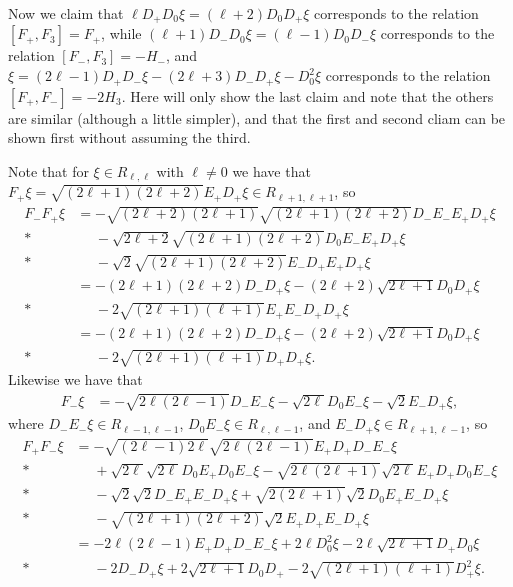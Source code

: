 Now we claim that $\ell D_+D_0\xi = (\ell+2)D_0D_+\xi$ corresponds to the relation $[F_+,F_3]=F_+$, while $(\ell+1)D_-D_0\xi = (\ell-1)D_0D_-\xi$ corresponds to the relation $[F_-,F_3]=-H_-$, and $\xi=(2\ell-1)D_+D_- \xi - (2\ell+3)D_-D_+ \xi - D_0^2 \xi$ corresponds to the relation $[F_+,F_-]=-2H_3$. Here will only show the last claim and note that the others are similar (although a little simpler), and that the first and second cliam can be shown first without assuming the third.

Note that for $\xi\in R_{\ell,\ell}$ with $\ell\neq 0$ we have that $F_+\xi = \sqrt{(2\ell+1)(2\ell+2)}E_+D_+\xi \in R_{\ell+1,\ell+1}$, so
\begin{align*}
  F_-F_+ \xi &= -\sqrt{(2\ell+2)(2\ell+1)}\sqrt{(2\ell+1)(2\ell+2)} D_-E_-E_+D_+ \xi \\*
           &\phantom{{}={}}{} - \sqrt{2\ell+2}\sqrt{(2\ell+1)(2\ell+2)} D_0E_-E_+D_+ \xi \\*
           &\phantom{{}={}}{} - \sqrt{2}\sqrt{(2\ell+1)(2\ell+2)}E_-D_+E_+D_+ \xi \\
           &= -(2\ell+1)(2\ell+2) D_-D_+ \xi - (2\ell+2)\sqrt{2\ell+1} D_0D_+ \xi \\*
           &\phantom{{}={}}{} - 2\sqrt{(2\ell+1)(\ell+1)} E_+E_-D_+D_+ \xi \\
           &= -(2\ell+1)(2\ell+2) D_-D_+ \xi - (2\ell+2)\sqrt{2\ell+1} D_0D_+ \xi \\*
           &\phantom{{}={}}{} - 2\sqrt{(2\ell+1)(\ell+1)} D_+D_+ \xi.
\end{align*}
Likewise we have that
\begin{align*}
  F_- \xi &= -\sqrt{2\ell(2\ell-1)}D_-E_- \xi - \sqrt{2\ell}D_0E_-\xi - \sqrt{2}E_-D_+\xi,
\end{align*}
where $D_-E_-\xi \in R_{\ell-1,\ell-1}$, $D_0E_-\xi \in R_{\ell,\ell-1}$, and $E_-D_+\xi \in R_{\ell+1,\ell-1}$, so
\begin{align*}
  F_+F_- \xi &= -\sqrt{(2\ell-1)2\ell}\sqrt{2\ell(2\ell-1)}E_+D_+D_-E_- \xi \\*
           &\phantom{{}={}}{} + \sqrt{2\ell}\sqrt{2\ell}D_0E_+D_0E_- \xi - \sqrt{2\ell(2\ell+1)}\sqrt{2\ell}E_+D_+D_0E_-\xi \\*
           &\phantom{{}={}}{} - \sqrt{2}\sqrt{2}D_-E_+E_-D_+ \xi + \sqrt{2(2\ell+1)}\sqrt{2}D_0E_+E_-D_+ \xi \\*
           &\phantom{{}={}}{} - \sqrt{(2\ell+1)(2\ell+2)}\sqrt{2} E_+D_+E_-D_+ \xi \\
           &= -2\ell(2\ell-1) E_+D_+D_-E_- \xi + 2\ell D_0^2 \xi - 2\ell\sqrt{2\ell+1}D_+D_0 \xi \\*
           &\phantom{{}={}}{} - 2 D_-D_+\xi + 2\sqrt{2\ell+1}D_0D_+ - 2\sqrt{(2\ell+1)(\ell+1)} D_+^2 \xi.
\end{align*}
